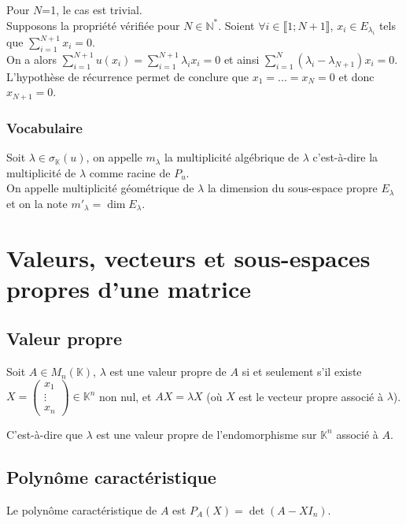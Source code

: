\documentclass[a4paper,10pt]{book} %
\newcommand{\N}{\mathbb{N}}
\newcommand{\K}{\mathbb{K}}
\newcommand{\displayAmath}{\displaystyle}
\begin{document}
Pour $N$=1, le cas est trivial.\\

Supposons la propriété vérifiée pour $N\in \N^*$. Soient $\forall i\in \llbracket 1; N+1 \rrbracket$, $x_i\in E_{\lambda_i}$ tels que $\displayAmath\sum_{i=1}^{N+1} x_i=0$.\\

On a alors $\displayAmath\sum_{i=1}^{N+1}u(x_i) =\sum_{i=1}^{N+1}\lambda_i x_i=0$ et ainsi $\displayAmath\sum_{i=1}^N (\lambda_i-\lambda_{N+1})x_i=0$.\\

L'hypothèse de récurrence permet de conclure que $x_1=...=x_N=0$ et donc $x_{N+1}=0$.

\subsubsection{Vocabulaire}
Soit $\lambda\in \sigma_\K(u)$, on appelle $m_\lambda$ la multiplicité algébrique de $\lambda$ c'est-à-dire la multiplicité de $\lambda$ comme racine de $P_u$.\\

On appelle multiplicité géométrique de $\lambda$ la dimension du sous-espace propre $E_\lambda$ et on la note $m'_\lambda=\dim E_\lambda$.

\newpage

\section{Valeurs, vecteurs et sous-espaces propres d'une matrice}
\subsection{Valeur propre}
Soit $A\in M_n(\K)$, $\lambda$ est une valeur propre de $A$ si et seulement s'il existe $X=\begin{pmatrix}
x_1\\\vdots\\x_n
\end{pmatrix}\in\K^n$ non nul, et $AX=\lambda X$ (où $X$ est le vecteur propre associé à $\lambda$).

C'est-à-dire que $\lambda$ est une valeur propre de l'endomorphisme sur $\K^n$ associé à $A$.

\subsection{Polynôme caractéristique}
Le polynôme caractéristique de $A$ est $P_A(X)=\det(A-X I_n)$.
\end{document}
